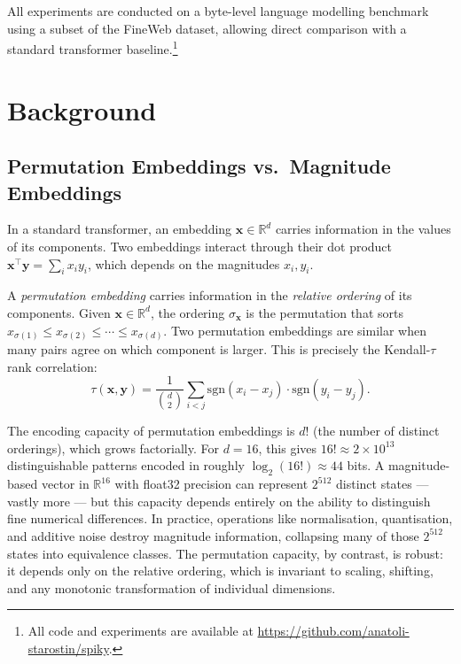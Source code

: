 \documentclass[11pt]{article}
\begin{document}
All experiments are conducted on a byte-level language modelling benchmark using a subset of the FineWeb dataset, allowing direct comparison with a standard transformer baseline.\footnote{All code and experiments are available at \url{https://github.com/anatoli-starostin/spiky}.}


\section{Background}
\label{sec:background}

\subsection{Permutation Embeddings vs.\ Magnitude Embeddings}

In a standard transformer, an embedding $\mathbf{x} \in \mathbb{R}^d$ carries information in the values of its components.
Two embeddings interact through their dot product $\mathbf{x}^\top \mathbf{y} = \sum_i x_i y_i$, which depends on the magnitudes $x_i, y_i$.

A \emph{permutation embedding} carries information in the \emph{relative ordering} of its components.
Given $\mathbf{x} \in \mathbb{R}^d$, the ordering $\sigma_\mathbf{x}$ is the permutation that sorts $x_{\sigma(1)} \leq x_{\sigma(2)} \leq \cdots \leq x_{\sigma(d)}$.
Two permutation embeddings are similar when many pairs agree on which component is larger.
This is precisely the Kendall-$\tau$ rank correlation:
\begin{equation}
    \tau(\mathbf{x}, \mathbf{y}) = \frac{1}{\binom{d}{2}} \sum_{i < j} \mathrm{sgn}(x_i - x_j) \cdot \mathrm{sgn}(y_i - y_j).
    \label{eq:kendall}
\end{equation}

The encoding capacity of permutation embeddings is $d!$ (the number of distinct orderings), which grows factorially.
For $d = 16$, this gives $16! \approx 2 \times 10^{13}$ distinguishable patterns encoded in roughly $\log_2(16!) \approx 44$ bits.
A magnitude-based vector in $\mathbb{R}^{16}$ with float32 precision can represent $2^{512}$ distinct states --- vastly more --- but this capacity depends entirely on the ability to distinguish fine numerical differences.
In practice, operations like normalisation, quantisation, and additive noise destroy magnitude information, collapsing many of those $2^{512}$ states into equivalence classes.
The permutation capacity, by contrast, is robust: it depends only on the relative ordering, which is invariant to scaling, shifting, and any monotonic transformation of individual dimensions.
\end{document}
